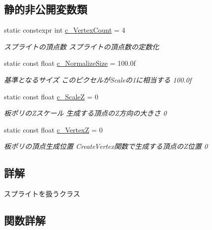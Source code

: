 \subsection*{静的非公開変数類}
\begin{DoxyCompactItemize}
\item 
static constexpr int \hyperlink{class_a_p_i_1_1_sprite_a7d0612770885bd905daaa74dee3eaca5}{c\+\_\+\+Vertex\+Count} = 4
\begin{DoxyCompactList}\small\item\em スプライトの頂点数  スプライトの頂点数の定数化 \end{DoxyCompactList}\item 
static const float \hyperlink{class_a_p_i_1_1_sprite_ad77d7d33858bc5288514fc4bad99a983}{c\+\_\+\+Normalize\+Size} = 100.\+0f
\begin{DoxyCompactList}\small\item\em 基準となるサイズ  このピクセルが\+Scaleの1に相当する  100.\+0f \end{DoxyCompactList}\item 
static const float \hyperlink{class_a_p_i_1_1_sprite_ad804c9e981cc840e5629fd162893744b}{c\+\_\+\+ScaleZ} = 0
\begin{DoxyCompactList}\small\item\em 板ポリの\+Zスケール  生成する頂点の\+Z方向の大きさ  0 \end{DoxyCompactList}\item 
static const float \hyperlink{class_a_p_i_1_1_sprite_a9c8bd1ba9b75570d1ad44479a342fedc}{c\+\_\+\+VertexZ} = 0
\begin{DoxyCompactList}\small\item\em 板ポリの頂点生成位置  Create\+Vertex関数で生成する頂点の\+Z位置  0 \end{DoxyCompactList}\end{DoxyCompactItemize}


\subsection{詳解}
スプライトを扱うクラス 

\subsection{関数詳解}
